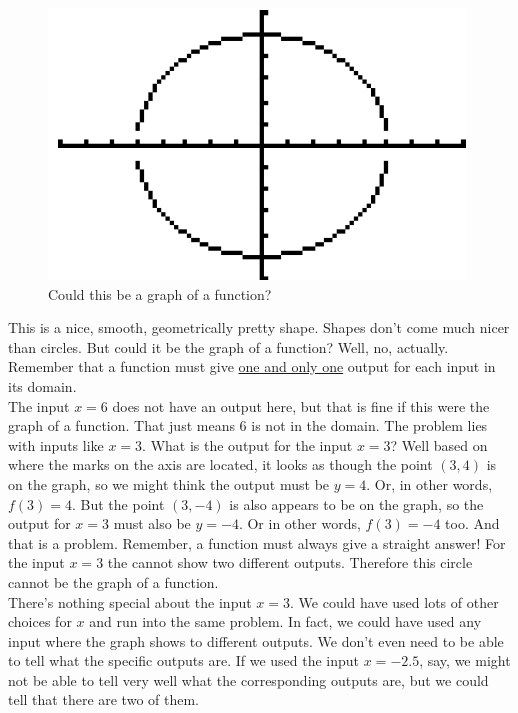 \begin{figure}[H]
	\centering
	\includegraphics[scale=1.0]{Sections/FunctionsandGraphsImages/Figure17.png}
	\caption{Could this be a graph of a function?}
\end{figure}

This is a nice, smooth, geometrically pretty shape. Shapes don’t come much nicer than circles. But could it be the graph of a function? Well, no, actually. Remember that a function must give \underline{one and only one} output for each input in its domain.\\

The input $x=6$ does not have an output here, but that is fine if this were the graph of a function. That just means $6$ is not in the domain. The problem lies with inputs like $x=3$. What is the output for the input $x=3$?  Well based on where the marks on the axis are located, it looks as though the point $(3,4)$ is on the graph, so we might think the output must be $y=4$. Or, in other words, $f(3)=4$. But the point $(3,-4)$ is also appears to be on the graph, so the output for $x=3$ must also be $y=-4$. Or in other words, $f(3)=-4$ too. And that is a problem. Remember, a function must always give a straight answer! For the input $x=3$ the  cannot show two different outputs. Therefore this circle cannot be the graph of a function.\\

There’s nothing special about the input $x=3$. We could have used lots of other choices for $x$ and run into the same problem. In fact, we could have used any input where the graph shows to different outputs. We don’t even need to be able to tell what the specific outputs are. If we used the input $x=-2.5$, say, we might not be able to tell very well what the corresponding outputs are, but we could tell that there are two of them.

